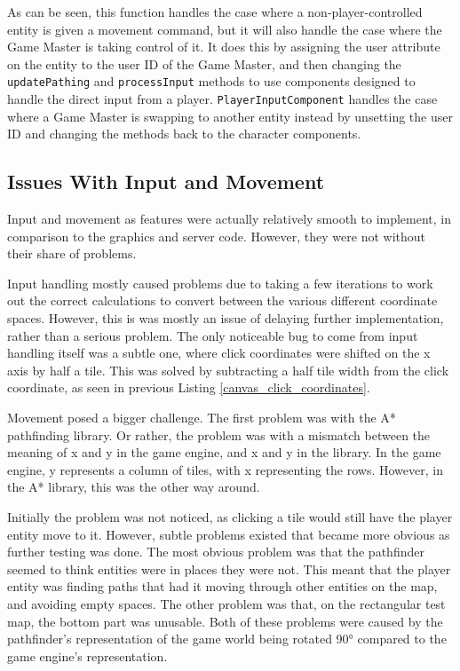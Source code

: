 As can be seen, this function handles the case where a non-player-controlled entity is given a movement command, but it will also handle the case where the Game Master is taking control of it. It does this by assigning the user attribute on the entity to the user ID of the Game Master, and then changing the \texttt{updatePathing} and \texttt{processInput} methods to use components designed to handle the direct input from a player. \texttt{PlayerInputComponent} handles the case where a Game Master is swapping to another entity instead by unsetting the user ID and changing the methods back to the character components.

\subsection{Issues With Input and Movement}
Input and movement as features were actually relatively smooth to implement, in comparison to the graphics and server code. However, they were not without their share of problems.

Input handling mostly caused problems due to taking a few iterations to work out the correct calculations to convert between the various different coordinate spaces. However, this is was mostly an issue of delaying further implementation, rather than a serious problem. The only noticeable bug to come from input handling itself was a subtle one, where click coordinates were shifted on the x axis by half a tile. This was solved by subtracting a half tile width from the click coordinate, as seen in previous Listing \ref{canvas_click_coordinates}.

Movement posed a bigger challenge. The first problem was with the A* pathfinding library. Or rather, the problem was with a mismatch between the meaning of x and y in the game engine, and x and y in the library. In the game engine, y represents a column of tiles, with x representing the rows. However, in the A* library, this was the other way around.

Initially the problem was not noticed, as clicking a tile would still have the player entity move to it. However, subtle problems existed that became more obvious as further testing was done. The most obvious problem was that the pathfinder seemed to think entities were in places they were not. This meant that the player entity was finding paths that had it moving through other entities on the map, and avoiding empty spaces. The other problem was that, on the rectangular test map, the bottom part was unusable. Both of these problems were caused by the pathfinder's representation of the game world being rotated 90° compared to the game engine's representation.

